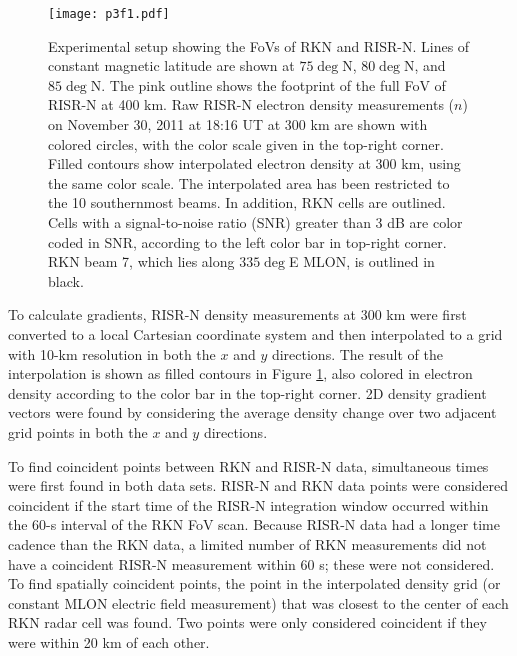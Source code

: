 \begin{figure}
	\texttt{[image: p3f1.pdf]}
  \caption[RKN/RISR-N Experimental Setup]{Experimental setup showing the FoVs of RKN and RISR-N. Lines of constant magnetic latitude are shown at \(75\deg\)N, \(80\deg\)N, and \(85\deg\)N. The pink outline shows the footprint of the full FoV of RISR-N at 400 km.  Raw RISR-N electron density measurements (\(n\)) on November 30, 2011 at 18:16 UT at 300 km are shown with colored circles, with the color scale given in the top-right corner.  Filled contours show interpolated electron density at 300 km, using the same color scale.  The interpolated area has been restricted to the 10 southernmost beams. In addition, RKN cells are outlined.  Cells with a signal-to-noise ratio (SNR) greater than 3 dB are color coded in SNR, according to the left color bar in top-right corner. RKN beam 7, which lies along \(335\deg\)E MLON, is outlined in black.}
  \label{fig:radar_map}
\end{figure}

To calculate gradients, RISR-N density measurements at 300 km were first converted to a local Cartesian coordinate system and then interpolated to a grid with 10-km resolution in both the \(x\) and \(y\) directions.  The result of the interpolation is shown as filled contours in Figure \ref{fig:radar_map}, also colored in electron density according to the color bar in the top-right corner.  2D density gradient vectors were found by considering the average density change over two adjacent grid points in both the \(x\) and \(y\) directions.


To find coincident points between RKN and RISR-N data, simultaneous times were first found in both data sets.  RISR-N and RKN data points were considered coincident if the start time of the RISR-N integration window occurred within the 60-s interval of the RKN FoV scan.  Because RISR-N data had a longer time cadence than the RKN data, a limited number of RKN measurements did not have a coincident RISR-N measurement within 60 s; these were not considered. To find spatially coincident points, the point in the interpolated density grid (or constant MLON electric field measurement) that was closest to the center of each RKN radar cell was found.  Two points were only considered coincident if they were within 20 km of each other.

